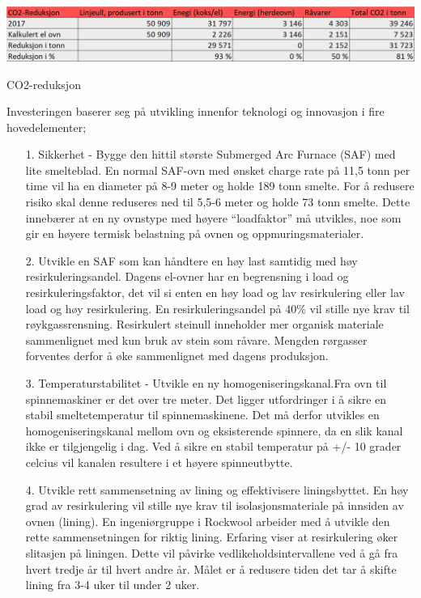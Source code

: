\begin{table}[H]
  \includegraphics[width=\linewidth]{tabeller/co2reduksjon.png}
  \caption{CO2-reduksjon}
  \label{tbl:co2reduksjon}
\end{table}

\indent \newline
Investeringen baserer seg på utvikling innenfor teknologi og innovasjon i fire hovedelementer;

\begin{itemize}
\item[1.] Sikkerhet - Bygge den hittil største Submerged Arc Furnace (SAF) med lite smelteblad. En normal SAF-ovn med ønsket charge rate på 11,5 tonn per time vil ha en diameter på 8-9 meter og holde 189 tonn smelte. For å redusere risiko skal denne reduseres ned til 5,5-6 meter og holde 73 tonn smelte. Dette innebærer at en ny ovnstype med høyere “loadfaktor” må utvikles, noe som gir en høyere termisk belastning på ovnen og oppmuringsmaterialer.

\item[2.] Utvikle en SAF som kan håndtere en høy last samtidig med høy resirkuleringsandel. Dagens el-ovner har en begrensning i load og resirkuleringsfaktor, det vil si enten en høy load og lav resirkulering eller lav load og høy resirkulering. En resirkuleringsandel på 40\% vil stille nye krav til røykgassrensning. Resirkulert steinull inneholder mer organisk materiale sammenlignet med kun bruk av stein som råvare. Mengden rørgasser forventes derfor å øke sammenlignet med dagens produksjon.

\item[3.] Temperaturstabilitet - Utvikle en ny homogeniseringskanal.Fra ovn til spinnemaskiner er det over tre meter. Det ligger utfordringer i å sikre en stabil smeltetemperatur til spinnemaskinene. Det må derfor utvikles en homogeniseringskanal mellom ovn og eksisterende spinnere, da en slik kanal ikke er tilgjengelig i dag. Ved å sikre en stabil temperatur på +/- 10 grader celcius vil kanalen resultere i et høyere spinneutbytte.

\item[4.] Utvikle rett sammensetning av lining og effektivisere liningsbyttet. En høy grad av resirkulering vil stille nye krav til isolasjonsmateriale på innsiden av ovnen (lining). En ingeniørgruppe i Rockwool arbeider med å utvikle den rette sammensetningen for riktig lining. Erfaring viser at resirkulering øker slitasjen på liningen. Dette vil påvirke vedlikeholdsintervallene ved å gå fra hvert tredje år til hvert andre år. Målet er å redusere tiden det tar å skifte lining fra 3-4 uker til under 2 uker.
\end{itemize}

